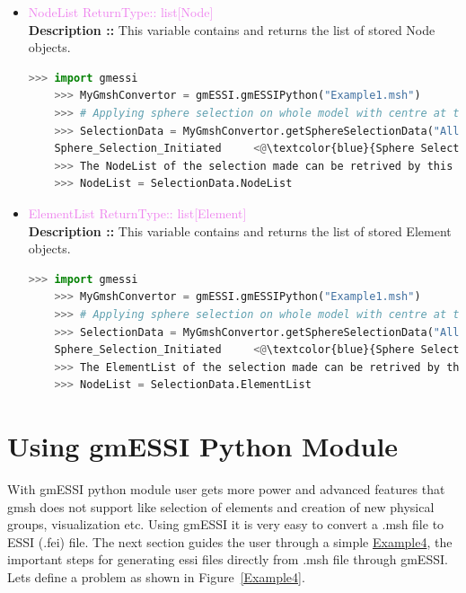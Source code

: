 \documentclass[11pt]{article}
\begin{document}
\begin{itemize}

    \item \textcolor{violet}{NodeList \hfill {ReturnType:: list[Node]}} \\
    \textbf{Description ::} This variable contains and returns the list of stored Node objects. 
    \begin{lstlisting}[language=Python]
    >>> import gmessi
    >>> MyGmshConvertor = gmESSI.gmESSIPython("Example1.msh")
    >>> # Applying sphere selection on whole model with centre at the cente of the model (2,0.5,0.5) and radius as 2 units
    >>> SelectionData = MyGmshConvertor.getSphereSelectionData("All",2,2,0.5,0.5)
    Sphere_Selection_Initiated     <@\textcolor{blue}{Sphere Selection Made over All Model with radius 2 and center at 2 0.5 0.5}@>
    >>> The NodeList of the selection made can be retrived by this function
    >>> NodeList = SelectionData.NodeList
    \end{lstlisting} 

    \item \textcolor{violet}{ElementList \hfill {ReturnType:: list[Element]}} \\
    \textbf{Description ::} This variable contains and returns the list of stored Element objects. 
    \begin{lstlisting}[language=Python]
    >>> import gmessi
    >>> MyGmshConvertor = gmESSI.gmESSIPython("Example1.msh")
    >>> # Applying sphere selection on whole model with centre at the cente of the model (2,0.5,0.5) and radius as 2 units
    >>> SelectionData = MyGmshConvertor.getSphereSelectionData("All",2,2,0.5,0.5)
    Sphere_Selection_Initiated     <@\textcolor{blue}{Sphere Selection Made over All Model with radius 2 and center at 2 0.5 0.5}@>
    >>> The ElementList of the selection made can be retrived by this function
    >>> NodeList = SelectionData.ElementList
    \end{lstlisting} 

\end{itemize}

\section{Using gmESSI Python Module}

With gmESSI python module user gets more power and advanced features that gmsh
does not support like selection of elements and creation of new physical
groups, visualization etc. Using gmESSI it is very easy to convert a
.msh file to ESSI (.fei) file. The next section guides the user through a
simple \href{http://beta.sumeetsinha.in/gmESSI/Examples/Example4}{
Example4}, the important steps for generating essi files directly
from
.msh
file through gmESSI. Lets define a problem as shown in Figure~\ref{Example4}.
\end{document}
